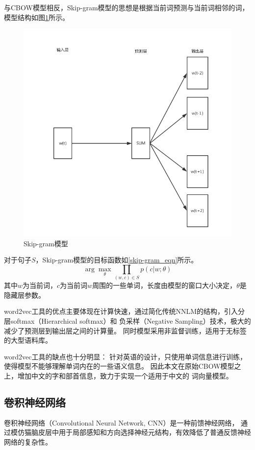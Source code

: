 与CBOW模型相反，Skip-gram模型的思想是根据当前词预测与当前词相邻的词，模型结构如图\ref{skip-gram}所示。
\begin{figure}[h]
    \includegraphics[scale=0.6]{picture/skip-gram.png}
    \caption{Skip-gram模型}
    \label{skip-gram}
\end{figure}
对于句子$S$，Skip-gram模型的目标函数如\ref{skip-gram_eqn}所示。
\begin{equation}
    \arg \max_{\theta } \prod_{\left ( w,c \right )\in S}p\left ( c|w;\theta \right )
    \label{skip-gram_eqn}
\end{equation}
其中$w$为当前词，$c$为当前词$w$周围的一些单词，长度由模型的窗口大小决定，$\theta$是隐藏层参数。

word2vec工具的优点主要体现在计算快速，通过简化传统NNLM的结构，引入分层softmax（Hierarchical softmax）和
负采样（Negative Sampling）技术，极大的减少了预测层到输出层之间的计算量。
同时模型采用非监督训练，适用于无标签的大型语料库。

word2vec工具的缺点也十分明显：
针对英语的设计，只使用单词信息进行训练，使得模型不能够理解单词内在的一些语义信息。
因此本文在原始CBOW模型之上，增加中文的字和部首信息，致力于实现一个适用于中文的
词向量模型。
\subsection{卷积神经网络}
卷积神经网络（Convolutional Neural Network, CNN）是一种前馈神经网络，
通过模仿猫脑皮层中用于局部感知和方向选择神经元结构，有效降低了普通反馈神经网络的复杂性。

